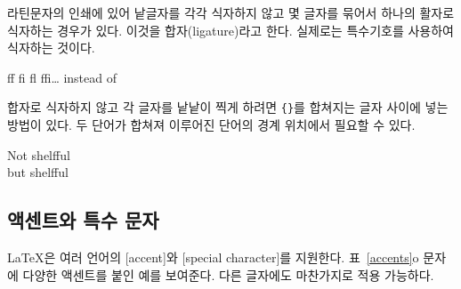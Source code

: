 라틴문자의 인쇄에 있어 낱글자를 각각 식자하지 않고 몇 글자를 묶어서 하나의 활자로 식자하는 경우가 있다.
이것을 합자(ligature)라고 한다. 실제로는 특수기호를 사용하여 식자하는 것이다.
\begin{code}
{\large ff fi fl ffi\ldots}\quad
instead of
\end{code}
합자로 식자하지 않고 각 글자를 낱낱이 찍게 하려면 \verb|{}|를 합쳐지는 글자 사이에 넣는 방법이 있다.
두 단어가 합쳐져 이루어진 단어의 경계 위치에서 필요할 수 있다.

\begin{example}
\Large Not shelfful\\
but shelf\mbox{}ful
\end{example}

\subsection{액센트와 특수 문자}

\LaTeX 은 여러 언어의 [accent]와 [special character]를 지원한다.
표~\ref{accents}\는 o 문자에 다양한 액센트를 붙인 예를 보여준다. 다른 글자에도 마찬가지로 적용 가능하다.

